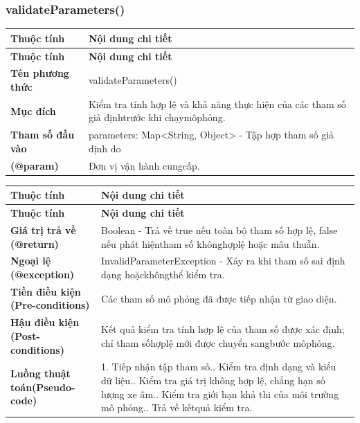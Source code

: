 \subsubsection{validateParameters()}
\begin{longtable}{|L{0.24\textwidth}|L{0.70\textwidth}|}
\hline
\textbf{Thuộc tính} & \textbf{Nội dung chi tiết} \\
\hline
\endfirsthead
\hline
\textbf{Thuộc tính} & \textbf{Nội dung chi tiết} \\
\hline
\endhead
\textbf{Tên phương thức} & validateParameters() \\
\hline
\textbf{Mục đích} & Kiểm tra tính hợp lệ và khả năng thực hiện của các tham số giả định\newline trước khi chạymôphỏng. \\
\hline
\textbf{Tham số đầu vào} & parameters: Map<String, Object> - Tập hợp tham số giả định do \\
\hline
\textbf{(@param)} & Đơn vị vận hành cungcấp. \\
\hline
\end{longtable}
\vspace{-0.5\baselineskip}
\begin{longtable}{|L{0.24\textwidth}|L{0.70\textwidth}|}
\hline
\textbf{Thuộc tính} & \textbf{Nội dung chi tiết} \\
\hline
\endfirsthead
\hline
\textbf{Thuộc tính} & \textbf{Nội dung chi tiết} \\
\hline
\endhead
\textbf{Giá trị trả về (@return)} & Boolean - Trả về true nếu toàn bộ tham số hợp lệ, false nếu phát hiện\newline tham số khônghợplệ hoặc mâu thuẫn. \\
\hline
\textbf{Ngoại lệ (@exception)} & InvalidParameterException - Xảy ra khi tham số sai định dạng hoặc\newline khôngthể kiểm tra. \\
\hline
\textbf{Tiền điều kiện (Pre-}\newline \textbf{conditions)} & Các tham số mô phỏng đã được tiếp nhận từ giao diện. \\
\hline
\textbf{Hậu điều kiện (Post-}\newline \textbf{conditions)} & Kết quả kiểm tra tính hợp lệ của tham số được xác định; chỉ tham số\newline hợplệ mới được chuyển sangbước môphỏng. \\
\hline
\textbf{Luồng thuật toán}\newline \textbf{(Pseudo-code)} & 1. Tiếp nhận tập tham số.. Kiểm tra định dạng và kiểu dữ liệu.. Kiểm tra giá trị không hợp lệ, chẳng hạn số lượng xe âm.. Kiểm tra giới hạn khả thi của môi trường mô phỏng.. Trả về kếtquả kiểm tra. \\
\hline
\end{longtable}
\vspace{-0.5\baselineskip}
